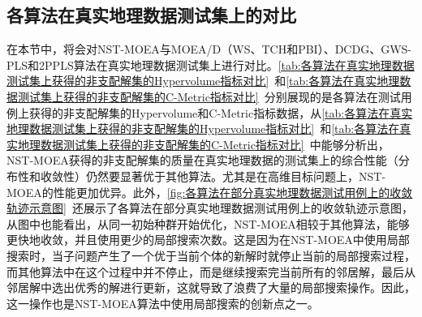 \subsection{各算法在真实地理数据测试集上的对比}
\label{subsec:NST:实验与讨论:各算法在真实地理数据测试集上的对比}
在本节中，将会对NST-MOEA与MOEA/D（WS、TCH和PBI）、DCDG、GWS-PLS和2PPLS算法在真实地理数据测试集上进行对比。\autoref{tab:各算法在真实地理数据测试集上获得的非支配解集的Hypervolume指标对比}~和\autoref{tab:各算法在真实地理数据测试集上获得的非支配解集的C-Metric指标对比}~分别展现的是各算法在测试用例上获得的非支配解集的Hypervolume和C-Metric指标数据，从\autoref{tab:各算法在真实地理数据测试集上获得的非支配解集的Hypervolume指标对比}~和\autoref{tab:各算法在真实地理数据测试集上获得的非支配解集的C-Metric指标对比}~中能够分析出，NST-MOEA获得的非支配解集的质量在真实地理数据的测试集上的综合性能（分布性和收敛性）仍然要显著优于其他算法。尤其是在高维目标问题上，NST-MOEA的性能更加优异。此外，\autoref{fig:各算法在部分真实地理数据测试用例上的收敛轨迹示意图}~还展示了各算法在部分真实地理数据测试用例上的收敛轨迹示意图，从图中也能看出，从同一初始种群开始优化，NST-MOEA相较于其他算法，能够更快地收敛，并且使用更少的局部搜索次数。这是因为在NST-MOEA中使用局部搜索时，当子问题产生了一个优于当前个体的新解时就停止当前的局部搜索过程，而其他算法中在这个过程中并不停止，而是继续搜索完当前所有的邻居解，最后从邻居解中选出优秀的解进行更新，这就导致了浪费了大量的局部搜索操作。因此，这一操作也是NST-MOEA算法中使用局部搜索的创新点之一。
\par
